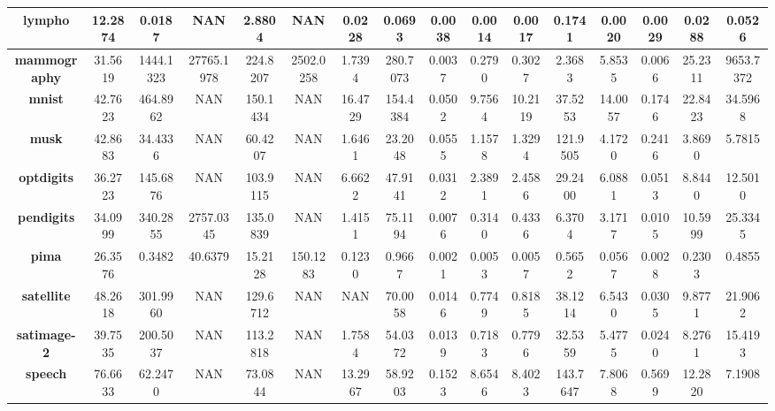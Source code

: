 \begin{table}
{\begin{tabular}{|c|c|c|c|c|c|c|c|c|c|c|c|c|c|c|c|}
		\textbf{lympho}           & 12.2874      & 0.0187    & NAN             & 2.8804    & NAN           & 0.0228    & 0.0693   & 0.0038    & 0.0014   & 0.0017   & 0.1741   & 0.0020     & 0.0029   & 0.0288   & 0.0526    \\ \hline
		\textbf{mammography}      & 31.5619      & 1444.1323 & 27765.1978  & 224.8207  & 2502.0258 & 1.7394    & 280.7073 & 0.0037    & 0.2790   & 0.3027   & 2.3683   & 5.8535     & 0.0066   & 25.2311  & 9653.7372 \\ \hline
		\textbf{mnist}            & 42.7623      & 464.8962  & NAN             & 150.1434  & NAN           & 16.4729   & 154.4384 & 0.0502    & 9.7564   & 10.2119  & 37.5253  & 14.0057    & 0.1746   & 22.8423  & 34.5968   \\ \hline
		\textbf{musk}             & 42.8683      & 34.4336   & NAN             & 60.4207   & NAN           & 1.6461    & 23.2048  & 0.0555    & 1.1578   & 1.3294   & 121.9505 & 4.1720     & 0.2416   & 3.8690   & 5.7815    \\ \hline
		\textbf{optdigits}        & 36.2723      & 145.6876  & NAN             & 103.9115  & NAN           & 6.6622    & 47.9141  & 0.0312    & 2.3891   & 2.4586   & 29.2400  & 6.0881     & 0.0513   & 8.8440   & 12.5010   \\ \hline
		\textbf{pendigits}        & 34.0999      & 340.2855  & 2757.0345   & 135.0839  & NAN           & 1.4151    & 75.1194  & 0.0076    & 0.3140   & 0.4336   & 6.3704   & 3.1717     & 0.0105   & 10.5999  & 25.3345   \\ \hline
		\textbf{pima}             & 26.3576      & 0.3482    & 40.6379     & 15.2128   & 150.1283  & 0.1230    & 0.9667   & 0.0021    & 0.0053   & 0.0057   & 0.5652   & 0.0567     & 0.0028   & 0.2303   & 0.4855    \\ \hline
		\textbf{satellite}        & 48.2618      & 301.9960  & NAN             & 129.6712  & NAN           & NAN           & 70.0058  & 0.0146    & 0.7749   & 0.8185   & 38.1214  & 6.5430     & 0.0305   & 9.8771   & 21.9062   \\ \hline
		\textbf{satimage-2}       & 39.7535      & 200.5037  & NAN             & 113.2818  & NAN           & 1.7584    & 54.0372  & 0.0139    & 0.7183   & 0.7796   & 32.5359  & 5.4775     & 0.0240   & 8.2761   & 15.4193   \\ \hline
		\textbf{speech}           & 76.6633      & 62.2470   & NAN             & 73.0844   & NAN           & 13.2967   & 58.9203  & 0.1523    & 8.6546   & 8.4023   & 143.7647 & 7.8068     & 0.5699   & 12.2820  & 7.1908    \\ \hline

\end{tabular}}
\end{table}
